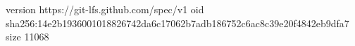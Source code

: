 version https://git-lfs.github.com/spec/v1
oid sha256:14e2b1936001018826742da6c17062b7adb186752c6ac8c39e20f4842eb9dfa7
size 11068
